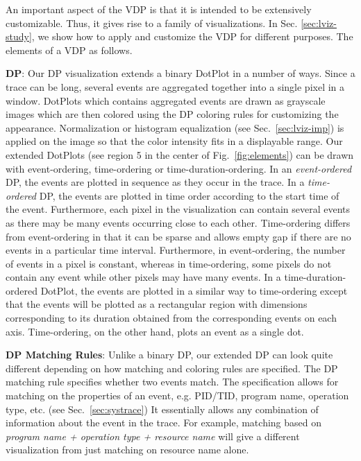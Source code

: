 An important aspect of the VDP is that it is intended to
be extensively customizable. Thus, it gives rise to a family of visualizations.
In Sec. \ref{sec:lviz-study}, we show how to apply and customize
the VDP for different purposes. The elements of a VDP as follows.

{\bf DP}:
Our DP visualization extends a binary DotPlot in a number of ways.
Since a trace can be long, several events are aggregated
together into a single pixel in a window.
DotPlots which contains aggregated events are drawn as grayscale images
which are then colored using the DP coloring rules for customizing
the appearance.
Normalization or histogram equalization (see Sec.~\ref{sec:lviz-imp})
is applied on the image so that the color intensity fits in a displayable range.
Our extended DotPlots (see region 5 in the center of Fig.~\ref{fig:elements})
can be drawn with event-ordering, time-ordering or time-duration-ordering.
In an {\em event-ordered} DP, the events are plotted in
sequence as they occur in the trace.
In a {\em time-ordered} DP, the events are plotted in time order
according to the start time of the event.
Furthermore, each pixel in the visualization can contain several events
as there may be many events occurring close to each other.
Time-ordering differs from event-ordering in that it can be sparse
and allows empty gap if there are no events in a particular time interval.
Furthermore, in event-ordering,
the number of events in a pixel is constant, whereas
in time-ordering,
some pixels do not contain any event while other pixels may have many events.
In a time-duration-ordered DotPlot, the events are plotted in a similar way
to time-ordering
except that the events will be plotted as a rectangular region
with dimensions corresponding to its duration obtained from
the corresponding events on each axis.
Time-ordering, on the other hand, plots
an event as a single dot.

{\bf DP Matching Rules}:
Unlike a binary DP, our extended DP can look quite different depending
on how matching and coloring rules are specified.
The DP matching rule specifies whether two events
match. The specification allows for matching on
the properties of an event, e.g. PID/TID, program name,
operation type, etc. (see Sec.~\ref{sec:systrace})
It essentially allows any combination of information about
the event in the trace.
For example, matching based on {\it program name + operation type + resource name}
will give a different visualization from just matching on resource name alone.

